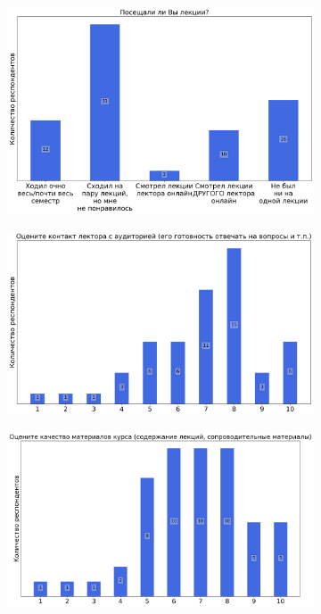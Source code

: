 		\begin{figure}[H]
			\centering
            \begin{subfigure}[b]{0.45\textwidth}
				\centering
				\includegraphics[width=\textwidth]{images/1 course/Информатика/lecturer-questions-Дивари И.Н.-0.png}
			\end{subfigure}
			\begin{subfigure}[b]{0.45\textwidth}
				\centering
				\includegraphics[width=\textwidth]{images/1 course/Информатика/lecturer-marks-Дивари И.Н.-0.png}
			\end{subfigure}
			\begin{subfigure}[b]{0.45\textwidth}
				\centering
				\includegraphics[width=\textwidth]{images/1 course/Информатика/lecturer-marks-Дивари И.Н.-1.png}

\end{subfigure}
\end{figure}
